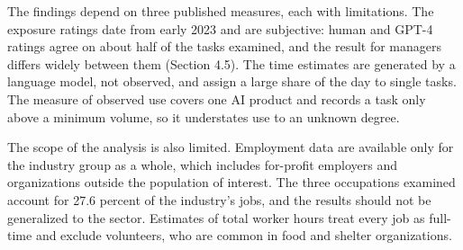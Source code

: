 The findings depend on three published measures, each with limitations. The exposure ratings date from early 2023 and are subjective: human and GPT-4 ratings agree on about half of the tasks examined, and the result for managers differs widely between them (Section 4.5). The time estimates are generated by a language model, not observed, and assign a large share of the day to single tasks. The measure of observed use covers one AI product and records a task only above a minimum volume, so it understates use to an unknown degree.

The scope of the analysis is also limited. Employment data are available only for the industry group as a whole, which includes for-profit employers and organizations outside the population of interest. The three occupations examined account for 27.6 percent of the industry's jobs, and the results should not be generalized to the sector. Estimates of total worker hours treat every job as full-time and exclude volunteers, who are common in food and shelter organizations.
